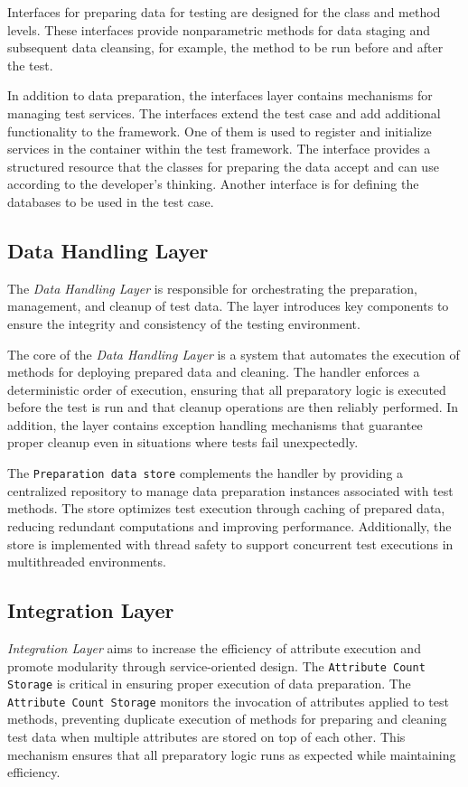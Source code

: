 Interfaces for preparing data for testing are designed for the class and method levels. These interfaces provide nonparametric methods for data staging and subsequent data cleansing, for example, the method to be run before and after the test.

In addition to data preparation, the interfaces layer contains mechanisms for managing test services. The interfaces extend the test case and add additional functionality to the framework.   One of them is used to register and initialize services in the container within the test framework. 
The interface provides a structured resource that the classes for preparing the data accept and can use according to the developer's thinking.
Another interface is for defining the databases to be used in the test case. 


\subsection{Data Handling Layer}

The \textit{Data Handling Layer} is responsible for orchestrating the preparation, management, and cleanup of test data. The layer introduces key components to ensure the integrity and consistency of the testing environment.

The core of the \textit{Data Handling Layer} is a system that automates the execution of methods for deploying prepared data and cleaning. The handler enforces a deterministic order of execution, ensuring that all preparatory logic is executed before the test is run and that cleanup operations are then reliably performed. In addition, the layer contains exception handling mechanisms that guarantee proper cleanup even in situations where tests fail unexpectedly.

The \texttt{Preparation data store} complements the handler by providing a centralized repository to manage data preparation instances associated with test methods. The store optimizes test execution through caching of prepared data, reducing redundant computations and improving performance. Additionally, the store is implemented with thread safety to support concurrent test executions in multithreaded environments.

\subsection{Integration Layer}
\textit{Integration Layer} aims to increase the efficiency of attribute execution and promote modularity through service-oriented design.
The \texttt{Attribute Count Storage} is critical in ensuring proper execution of data preparation. The \texttt{Attribute Count Storage} monitors the invocation of attributes applied to test methods, preventing duplicate execution of methods for preparing and cleaning test data when multiple attributes are stored on top of each other. This mechanism ensures that all preparatory logic runs as expected while maintaining efficiency.

